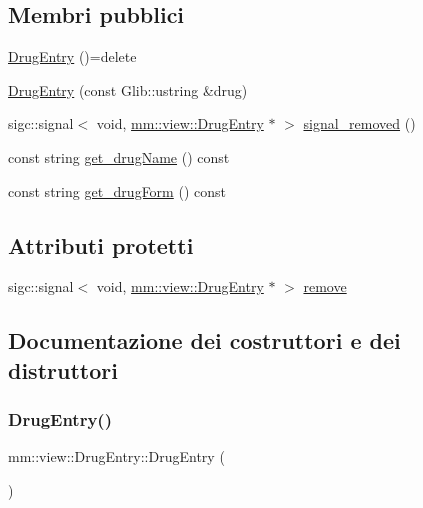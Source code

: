 \subsection*{Membri pubblici}
\begin{DoxyCompactItemize}
\item 
\mbox{\hyperlink{classmm_1_1view_1_1_drug_entry_a7ad0e954cd9933565be5a86d6a808249}{Drug\+Entry}} ()=delete
\item 
\mbox{\hyperlink{classmm_1_1view_1_1_drug_entry_ac1fceaa91adf2812b93c1e1388068c27}{Drug\+Entry}} (const Glib\+::ustring \&drug)
\item 
sigc\+::signal$<$ void, \mbox{\hyperlink{classmm_1_1view_1_1_drug_entry}{mm\+::view\+::\+Drug\+Entry}} $\ast$ $>$ \mbox{\hyperlink{classmm_1_1view_1_1_drug_entry_aa7a9f1fd2d7a48a803314fa2c9a86370}{signal\+\_\+removed}} ()
\item 
const string \mbox{\hyperlink{classmm_1_1view_1_1_drug_entry_ada43ec12abdaf70f4c3070b6e7f9806d}{get\+\_\+drug\+Name}} () const
\item 
const string \mbox{\hyperlink{classmm_1_1view_1_1_drug_entry_a9034293f6c4dbe85af9d02751684d845}{get\+\_\+drug\+Form}} () const
\end{DoxyCompactItemize}
\subsection*{Attributi protetti}
\begin{DoxyCompactItemize}
\item 
sigc\+::signal$<$ void, \mbox{\hyperlink{classmm_1_1view_1_1_drug_entry}{mm\+::view\+::\+Drug\+Entry}} $\ast$ $>$ \mbox{\hyperlink{classmm_1_1view_1_1_drug_entry_a34bee6e0f8a4722c4e41b333eac49f60}{remove}}
\end{DoxyCompactItemize}


\subsection{Documentazione dei costruttori e dei distruttori}
\mbox{\label{classmm_1_1view_1_1_drug_entry_a7ad0e954cd9933565be5a86d6a808249}} 
\subsubsection{\texorpdfstring{Drug\+Entry()}{DrugEntry()}\hspace{0.1cm}{\footnotesize\ttfamily [1/2]}}
{\footnotesize\ttfamily mm\+::view\+::\+Drug\+Entry\+::\+Drug\+Entry (\begin{DoxyParamCaption}{ }\end{DoxyParamCaption})\hspace{0.3cm}{\ttfamily [delete]}}

